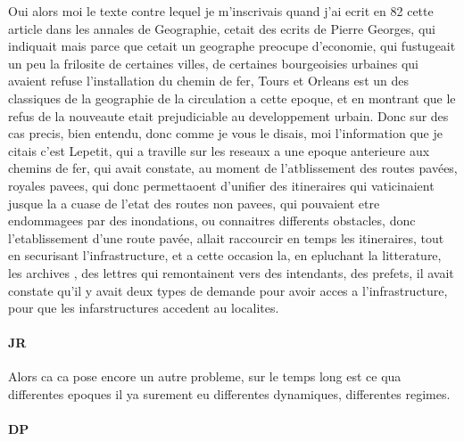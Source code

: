 \documentclass[12pt]{article}
\begin{document}
Oui alors moi le texte contre lequel je m'inscrivais quand j'ai ecrit en 82 cette article dans les annales de Geographie, cetait des ecrits de Pierre Georges, qui indiquait mais parce que cetait un geographe preocupe d'economie, qui fustugeait un peu la frilosite de certaines villes, de certaines bourgeoisies urbaines qui avaient refuse l'installation du chemin de fer, Tours et Orleans est un des classiques de la geographie de la circulation a cette epoque, et en montrant que le refus de la nouveaute etait prejudiciable au developpement urbain. Donc sur des cas precis, bien entendu, donc comme je vous le disais, moi l'information que je citais c'est Lepetit, qui a traville sur les reseaux a une epoque anterieure aux chemins de fer, qui avait constate, au moment de l'atblissement des routes pavées, royales pavees, qui donc permettaoent d'unifier des itineraires qui vaticinaient jusque la a cuase de l'etat des routes non pavees, qui pouvaient etre endommagees par des inondations, ou connaitres differents obstacles, donc l'etablissement d'une route pavée, allait raccourcir en temps les itineraires, tout en securisant l'infrastructure, et a cette occasion la, en epluchant la litterature, les archives , des lettres qui remontainent vers des intendants, des prefets, il avait constate qu'il y avait deux types de demande pour avoir acces a l'infrastructure, pour que les infarstructures accedent au localites. 

\paragraph{JR}

Alors ca ca pose encore un autre probleme, sur le temps long est ce qua differentes epoques il ya surement eu differentes dynamiques, differentes regimes.

\paragraph{DP}
\end{document}

